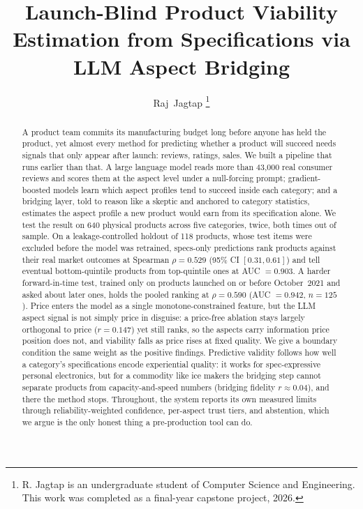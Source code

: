 \documentclass[journal]{IEEEtran}
\begin{document}
\title{Launch-Blind Product Viability Estimation from Specifications via LLM Aspect Bridging}

\author{Raj~Jagtap%
\thanks{R. Jagtap is an undergraduate student of Computer Science and Engineering. This work was completed as a final-year capstone project, 2026.}}

\maketitle

\begin{abstract}
A product team commits its manufacturing budget long before anyone has held the product, yet almost every method for predicting whether a product will succeed needs signals that only appear after launch: reviews, ratings, sales. We built a pipeline that runs earlier than that. A large language model reads more than 43{,}000 real consumer reviews and scores them at the aspect level under a null-forcing prompt; gradient-boosted models learn which aspect profiles tend to succeed inside each category; and a bridging layer, told to reason like a skeptic and anchored to category statistics, estimates the aspect profile a new product would earn from its specification alone. We test the result on 640 physical products across five categories, twice, both times out of sample. On a leakage-controlled holdout of 118 products, whose test items were excluded before the model was retrained, specs-only predictions rank products against their real market outcomes at Spearman $\rho = 0.529$ (95\% CI $[0.31, 0.61]$) and tell eventual bottom-quintile products from top-quintile ones at AUC $= 0.903$. A harder forward-in-time test, trained only on products launched on or before October~2021 and asked about later ones, holds the pooled ranking at $\rho = 0.590$ (AUC $= 0.942$, $n = 125$). Price enters the model as a single monotone-constrained feature, but the LLM aspect signal is not simply price in disguise: a price-free ablation stays largely orthogonal to price ($r = 0.147$) yet still ranks, so the aspects carry information price position does not, and viability falls as price rises at fixed quality. We give a boundary condition the same weight as the positive findings. Predictive validity follows how well a category's specifications encode experiential quality: it works for spec-expressive personal electronics, but for a commodity like ice makers the bridging step cannot separate products from capacity-and-speed numbers (bridging fidelity $r \approx 0.04$), and there the method stops. Throughout, the system reports its own measured limits through reliability-weighted confidence, per-aspect trust tiers, and abstention, which we argue is the only honest thing a pre-production tool can do.
\end{abstract}
\end{document}
